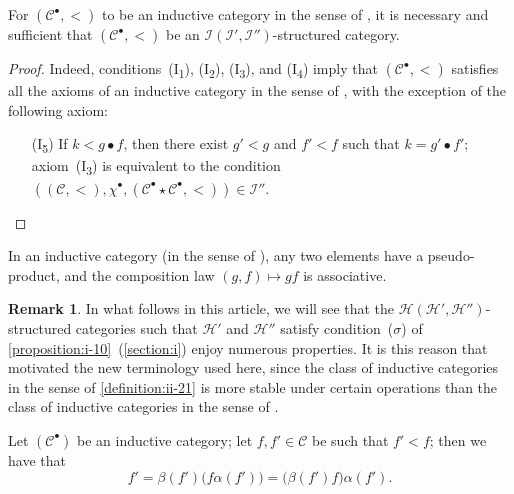 \documentclass[a4paper,fleqn]{article}
\theoremstyle{plain}
\newenvironment{proposition}[1]
  {\renewcommand\theinnerproposition{#1}\innerproposition}
  {\endinnerproposition}
\newenvironment{corollary}[1]
  {\renewcommand\theinnercorollary{#1}\innercorollary}
  {\endinnercorollary}
\theoremstyle{definition}
\newtheorem*{remark}{Remark}
\newcommand{\CC}{\mathcal{C}}
\newcommand{\HH}{\mathcal{H}}
\newcommand{\II}{\mathcal{I}}
\newcommand{\smallbullet}{\bullet}
\begin{document}
\begin{corollary}{1}
  For $(\CC^\smallbullet,<)$ to be an inductive category in the sense of \cite{3c}, it is necessary and sufficient that $(\CC^\smallbullet,<)$ be an $\II(\II',\II'')$-structured category.
\end{corollary}

\begin{proof}
  Indeed, conditions~(I\textsubscript{1}), (I\textsubscript{2}), (I\textquotesingle\!\textsubscript{3}), and (I\textquotesingle\!\textsubscript{4}) imply that $(\CC^\smallbullet,<)$ satisfies all the axioms of an inductive category in the sense of \cite{3c}, with the exception of the following axiom:
  \begin{enumerate}
    \item[\normalfont(I\textquotesingle\!\textsubscript{5})]
      If $k<g\smallbullet f$, then there exist $g'<g$ and $f'<f$ such that $k=g'\smallbullet f'$;
      axiom~(I\textquotesingle\!\textsubscript{3}) is equivalent to the condition $((\CC,<),\chi^\smallbullet,(\CC^\smallbullet\star\CC^\smallbullet,<))\in\II''$.
      \qedhere
  \end{enumerate}
\end{proof}

\begin{corollary}{2}
  In an inductive category (in the sense of \cite{3c}), any two elements have a pseudo-product, and the composition law $(g,f)\mapsto gf$ is associative.
\end{corollary}

\begin{remark}
  In what follows in this article, we will see that the $\HH(\HH',\HH'')$-structured categories such that $\HH'$ and $\HH''$ satisfy condition~($\sigma$) of \cref{proposition:i-10}~(\cref{section:i}) enjoy numerous properties.
  It is this reason that motivated the new terminology used here, since the class of inductive categories in the sense of \cref{definition:ii-21} is more stable under certain operations than the class of inductive categories in the sense of \cite{3c}.
\end{remark}

\begin{proposition}{24}
\label{proposition:ii-24}
  Let $(\CC^\smallbullet)$ be an inductive category;
  let $f,f'\in\CC$ be such that $f'<f$;
  then we have that
  \[
    f'
    = \beta(f')\big(f\alpha(f')\big)
    = \big(\beta(f')f)\alpha(f').
  \]
\end{proposition}
\end{document}
